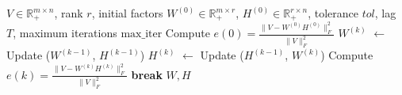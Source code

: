 \begin{algorithm}
    \caption{Two-blocks coordinate descent for NMF with stopping criterion \ref{stopping criterion I}}
    \label{Two block exact CD}
    \begin{algorithmic}[1]
        \Require \( V \in \mathbb{R}_+^{m \times n} \), rank \( r \), initial factors \( W^{(0)} \in \mathbb{R}_+^{m \times r} \), \( H^{(0)} \in \mathbb{R}_+^{r \times n} \), tolerance \( tol \), lag \( T \), maximum iterations \( \text{max\_iter} \)
        \State Compute \( e(0) = \frac{\|V - W^{(0)}H^{(0)}\|_F^2}{\|V\|_F^2} \)
            \State \(W^{(k)}\) $\gets$ Update (\( W^{(k - 1)} \), \( H^{(k-1)} \))
            \State \(H^{(k)}\) $\gets$ Update (\( H^{(k - 1)} \), \( W^{(k)} \))
            \State Compute \( e(k) = \frac{\|V - W^{(k)}H^{(k)}\|_F^2}{\|V\|_F^2} \)
                \State \textbf{break}
            \EndIf
        \EndFor
        \State \Return \( W, H \)
    \end{algorithmic}
\end{algorithm}
